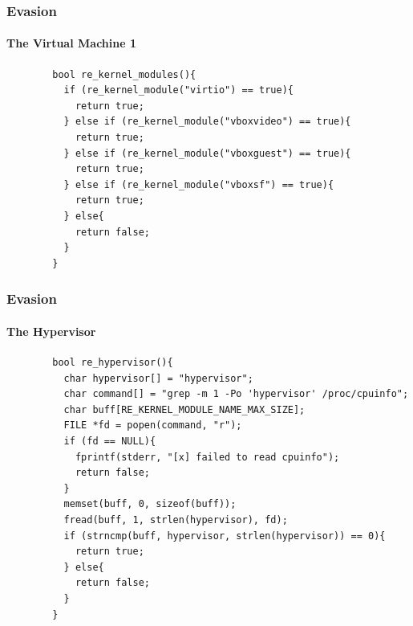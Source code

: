 \documentclass[aspectratio=169]{beamer}
\begin{document}
\begin{frame}[fragile]{}
  \frametitle{Evasion}
  \framesubtitle{The Virtual Machine 1}
  \begin{center}
    \begin{tcolorbox}[title=re.c,colback=black]
    \begin{minipage}{0.5\textwidth}
      \begin{verbatim}
        bool re_kernel_modules(){
          if (re_kernel_module("virtio") == true){
            return true;
          } else if (re_kernel_module("vboxvideo") == true){
            return true;
          } else if (re_kernel_module("vboxguest") == true){
            return true;
          } else if (re_kernel_module("vboxsf") == true){
            return true;
          } else{
            return false;
          }
        }
      \end{verbatim}
    \end{minipage}
    \end{tcolorbox}
  \end{center}
\end{frame}

\begin{frame}[fragile]{}
  \frametitle{Evasion}
  \framesubtitle{The Hypervisor}
  \begin{center}
    \begin{tcolorbox}[title=re.c,colback=black]
    \begin{minipage}{0.5\textwidth}
      \begin{verbatim}
        bool re_hypervisor(){
          char hypervisor[] = "hypervisor";
          char command[] = "grep -m 1 -Po 'hypervisor' /proc/cpuinfo";
          char buff[RE_KERNEL_MODULE_NAME_MAX_SIZE];
          FILE *fd = popen(command, "r");
          if (fd == NULL){
            fprintf(stderr, "[x] failed to read cpuinfo");
            return false;
          }
          memset(buff, 0, sizeof(buff));
          fread(buff, 1, strlen(hypervisor), fd);
          if (strncmp(buff, hypervisor, strlen(hypervisor)) == 0){
            return true;
          } else{
            return false;
          }
        }
      \end{verbatim}
    \end{minipage}
    \end{tcolorbox}
  \end{center}
\end{frame}
\end{document}
